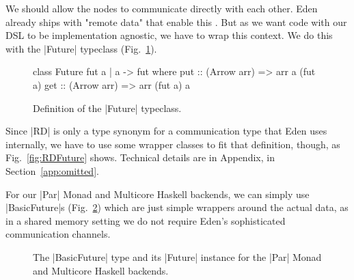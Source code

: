 We should allow the nodes to communicate directly with each other. Eden already ships with "remote data" that enable this \cite{AlGo03a,Dieterle2010}.
But as we want code with our DSL to be implementation agnostic, we have to wrap this context. We do this with the |Future| typeclass (Fig.~\ref{fig:future}).
\begin{figure}[h]
\begin{code}
class Future fut a | a -> fut where
    put :: (Arrow arr) => arr a (fut a)
    get :: (Arrow arr) => arr (fut a) a
\end{code}
\caption{Definition of the |Future| typeclass.}
\label{fig:future}
\end{figure}
Since |RD| is only a type synonym for a communication type that Eden uses internally, we have to use some wrapper classes to fit that definition, though, as Fig.~\ref{fig:RDFuture} shows. %
Technical details are in Appendix, in Section~\ref{app:omitted}.

For our |Par| Monad and Multicore Haskell backends, we can simply use |BasicFuture|s (Fig.~\ref{fig:BasicFuture}) which are just simple wrappers around the actual data, as in a shared memory setting we do not require Eden's sophisticated communication channels.
\begin{figure}[tb]
\caption{The |BasicFuture| type and its |Future| instance for the |Par| Monad and Multicore Haskell backends.}
\label{fig:BasicFuture}
\end{figure} %


